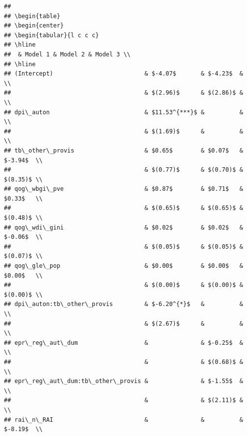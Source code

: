 \documentclass[
]{article}
\begin{document}
\begin{verbatim}
## 
## \begin{table}
## \begin{center}
## \begin{tabular}{l c c c}
## \hline
##  & Model 1 & Model 2 & Model 3 \\
## \hline
## (Intercept)                          & $-4.07$       & $-4.23$  &          \\
##                                      & $(2.96)$      & $(2.86)$ &          \\
## dpi\_auton                           & $11.53^{***}$ &          &          \\
##                                      & $(1.69)$      &          &          \\
## tb\_other\_provis                    & $0.65$        & $0.07$   & $-3.94$  \\
##                                      & $(0.77)$      & $(0.70)$ & $(8.35)$ \\
## qog\_wbgi\_pve                       & $0.87$        & $0.71$   & $0.33$   \\
##                                      & $(0.65)$      & $(0.65)$ & $(0.48)$ \\
## qog\_wdi\_gini                       & $0.02$        & $0.02$   & $-0.06$  \\
##                                      & $(0.05)$      & $(0.05)$ & $(0.07)$ \\
## qog\_gle\_pop                        & $0.00$        & $0.00$   & $0.00$   \\
##                                      & $(0.00)$      & $(0.00)$ & $(0.00)$ \\
## dpi\_auton:tb\_other\_provis         & $-6.20^{*}$   &          &          \\
##                                      & $(2.67)$      &          &          \\
## epr\_reg\_aut\_dum                   &               & $-0.25$  &          \\
##                                      &               & $(0.68)$ &          \\
## epr\_reg\_aut\_dum:tb\_other\_provis &               & $-1.55$  &          \\
##                                      &               & $(2.11)$ &          \\
## rai\_n\_RAI                          &               &          & $-8.19$  \\

\end{verbatim}
\end{document}
